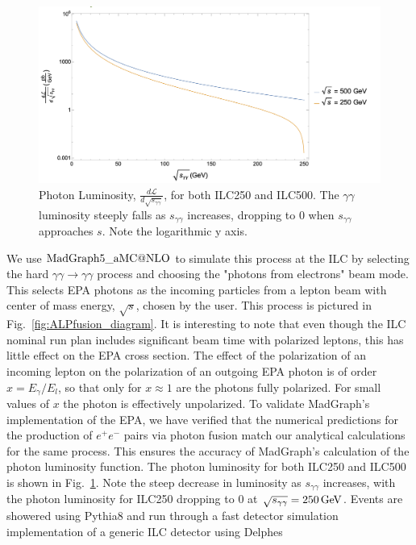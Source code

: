 \documentclass[aps,onecolumn,twoside,secnumarabic,12pt,balancelastpage,amsmath,amssymb,nofootinbib,hyperref=pdftex]{revtex4}
\begin{document}
\begin{figure}[t]
\begin{center}
\includegraphics[width=14cm]{luminosity.png}
\caption{Photon Luminosity, $\frac{d\mathcal{L}}{d \sqrt{s_{\gamma\gamma}}}$, for both ILC250 and ILC500. The $\gamma\gamma$ luminosity steeply falls as $s_{\gamma\gamma}$ increases, dropping to 0 when $s_{\gamma\gamma}$ approaches  $s$. Note the logarithmic y axis.}
\label{fig:luminosity}
\end{center}
\end{figure}
\vskip 0.12in
We use $\rm{MadGraph5\_aMC@NLO}$\cite{Alwall:2014hca} to simulate this process at the ILC by selecting the hard $\gamma\gamma\rightarrow \gamma\gamma$ process and choosing the "photons from electrons" beam mode. This selects EPA photons as the incoming particles from a lepton beam with center of mass energy, $\sqrt{s}$, chosen by the user. This process is pictured in Fig.~\ref{fig:ALPfusion_diagram}.
\vskip 0.12in
It is interesting to note that even though the ILC nominal run plan includes significant beam time with polarized leptons, this has little effect on the EPA cross section. The effect of the polarization of an incoming lepton on the polarization of an outgoing EPA photon is of order $x = E_{\gamma}/E_{l}$, so that only for $x\approx 1$ are the photons fully polarized. For small values of $x$ the photon is effectively unpolarized\cite{Philipsen:1992gz}.
To validate MadGraph's implementation of the EPA, we have verified that the numerical predictions for the production of $e^{+}e^{-}$ pairs via photon fusion match our analytical calculations for the same process. This ensures the accuracy of MadGraph's calculation of the photon luminosity function. 
\vskip 0.12in
The photon luminosity for both ILC250 and ILC500 is shown in Fig.~\ref{fig:luminosity}. Note the steep decrease in luminosity as $s_{\gamma\gamma}$ increases, with the photon luminosity for ILC250 dropping to 0 at $\sqrt{s_{\gamma\gamma}} = 250\,\rm{GeV}$. Events are showered using Pythia8\cite{Sjostrand:2014zea} and run through a fast detector simulation implementation of a generic ILC detector using Delphes\cite{deFavereau:2013fsa,Zarnecki}
\end{document}
